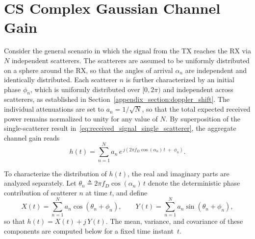 \section{CS Complex Gaussian Channel Gain}
\label{appendix_section:cs_complex_gaussian_channel_gain}

Consider the general scenario in which the signal from the \ac{TX} reaches the \ac{RX} via $N$ independent scatterers.
The scatterers are assumed to be uniformly distributed on a sphere around the \ac{RX}, so that the angles of arrival $\alpha_n$ are independent and identically distributed.
Each scatterer $n$ is further characterized by an initial phase $\phi_n$, which is uniformly distributed over $[0, 2\pi)$ and independent across scatterers, as established in Section~\ref{appendix_section:doppler_shift}.
The individual attenuations are set to $a_n = 1/\sqrt{N}$, so that the total expected received power remains normalized to unity for any value of $N$.
By superposition of the single-scatterer result in~\eqref{eq:received_signal_single_scatterer}, the aggregate channel gain reads
\begin{equation}
\label{eq:aggregate_channel_gain}
    h(t) = \sum_{n=1}^{N} a_n \, e^{\,j(2\pi f_D \cos(\alpha_n)\, t \;+\; \phi_n)}.
\end{equation}

To characterize the distribution of $h(t)$, the real and imaginary parts are analyzed separately.
Let $\theta_n \triangleq 2\pi f_D \cos(\alpha_n)\, t$ denote the deterministic phase contribution of scatterer $n$ at time $t$, and define
\begin{equation}
    X(t) = \sum_{n=1}^{N} a_n \cos(\theta_n + \phi_n),
    \qquad
    Y(t) = \sum_{n=1}^{N} a_n \sin(\theta_n + \phi_n),
\end{equation}
so that $h(t) = X(t) + j\,Y(t)$.
The mean, variance, and covariance of these components are computed below for a fixed time instant~$t$.

